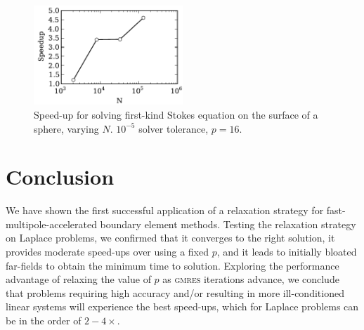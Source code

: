 \documentclass[final,leqno,]{siamltex1213}
\newcommand{\gmres}{\textsc{gmres}\xspace}
\begin{document}
\begin{figure}[h]
\begin{center}
	\includegraphics[natwidth=3in,natheight=2in,width=0.5\textwidth]{StokesSpeedupRelaxation.pdf}
	\caption{Speed-up for solving first-kind Stokes equation on the surface of a sphere, varying $N$. $10^{-5}$ solver tolerance, $p=16$. }
	\label{fig:stokes_speedup}
\end{center}
\end{figure}


\section{Conclusion} 

We have shown the first successful application of a relaxation strategy for fast-multipole-accelerated boundary element methods. Testing the relaxation strategy on Laplace problems, we confirmed that it converges to the right solution, it provides moderate speed-ups over using a fixed $p$, and it leads to initially bloated far-fields to obtain the minimum time to solution.
Exploring the performance advantage of relaxing the value of $p$ as \gmres iterations advance, we conclude that problems requiring high accuracy and/or resulting in more ill-conditioned linear systems will experience the best speed-ups, which for Laplace problems can be in the order of $2-4\times$.


 

\end{document}

